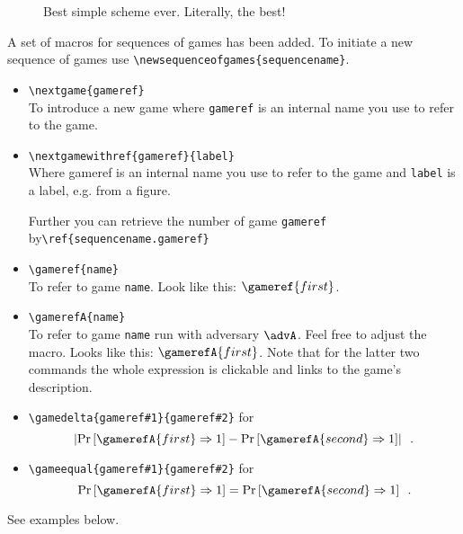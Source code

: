 \begin{figure}[ht!]%
	\centering%
	\nicoresetlinenr
	\fbox{%
		\begin{minipage}[t]{3cm}
			\calg{}%
			\begin{nicodemus}
				\item 
			\end{nicodemus}
		\medskip
			\coracle{} 
			\begin{nicodemus}
				\item 
			\end{nicodemus}
		\end{minipage}
		\qquad
		\begin{minipage}[t]{4cm}
			\coracle{}
			\begin{nicodemus}
				\item 
			\end{nicodemus}
		\end{minipage}
	}%
	\caption{Best simple scheme ever. Literally, the best!}
	\label{simple-figure}
\end{figure}
A set of macros for sequences of games has been added. To initiate a new sequence of games use \verb|\newsequenceofgames{sequencename}|.
\begin{itemize}
\item \verb|\nextgame{gameref}|\\
To introduce a new game where \verb|gameref| is an internal name you use to refer to the game.
\item \verb|\nextgamewithref{gameref}{label}|\\
Where gameref is an internal name you use to refer to the game and \verb|label| is a label, e.g. from a figure.

Further you can retrieve the number of game \verb|gameref| by\linebreak\verb|\ref{sequencename.gameref}|
\item \verb|\gameref{name}|\\
To refer to game \verb|name|. Look like this: $\gameref{first}$.
\item \verb|\gamerefA{name}|\\
To refer to game \verb|name| run with adversary $\advA$. Feel free to adjust the macro. Looks like this:
$\gamerefA{first}$. Note that for the latter two commands the whole expression is clickable and links to the game's description.
\item \verb|\gamedelta{gameref#1}{gameref#2}| for
\[
\left|\Pr\left[\gamerefA{first}\Rightarrow 1\right]-\Pr\left[\gamerefA{second}\Rightarrow 1\right]\right|\enspace.
\]
\item \verb|\gameequal{gameref#1}{gameref#2}| for
\[
\Pr\left[\gamerefA{first}\Rightarrow 1\right]=\Pr\left[\gamerefA{second}\Rightarrow 1\right]\enspace.
\]
\end{itemize}
See examples below.

